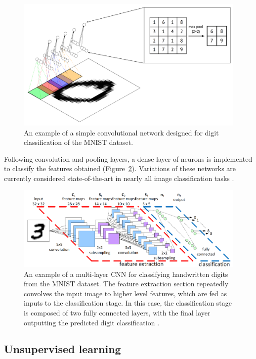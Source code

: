 \documentclass[12pt,oneside,onecolumn,a4paper]{article}
\begin{document}
\begin{figure}[H]
\begin{center}
\includegraphics[width=0.8\columnwidth]{figures/convnet}
\caption{An example of a simple convolutional network designed for digit classification of the MNIST dataset. \label{fig:convolutional_mnist}}%
\end{center}
\end{figure}

Following convolution and pooling layers, a dense layer of neurons is implemented to classify the features obtained (Figure~\ref{fig:mnist_full}). Variations of these networks are currently considered state-of-the-art in nearly all image classification tasks \citep{Koushik2016UnderstandingCN}.

\begin{figure}[H]
\begin{center}
\includegraphics[width=0.8\columnwidth]{figures/CNN/CNN}
\caption{An example of a multi-layer CNN for classifying handwritten digits from the MNIST dataset. The feature extraction section repeatedly convolves the input image to higher level features, which are fed as inputs to the classification stage. In this case, the classification stage is composed of two fully connected layers, with the final layer outputting the predicted digit classification \citep{peemen_mesman_corporaal_2011}. \label{fig:mnist_full}%
}
\end{center}
\end{figure}

\subsection{Unsupervised learning}
\end{document}

